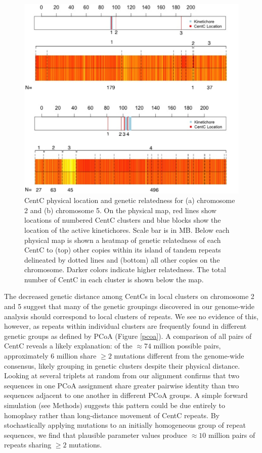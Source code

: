 \begin{figure}[h]
\centering
\includegraphics[width=1\textwidth]{heatmap.png}
\caption{CentC physical location and genetic relatedness for (a) chromosome 2 and (b) chromosome 5.  On the physical map, red lines show locations of numbered CentC clusters and blue blocks show the location of the active kinetichores.  Scale bar is in MB.  Below each physical map is shown a heatmap of genetic relatedness of each CentC to (top) other copies within its island of tandem repeats delineated by dotted lines and (bottom) all other copies on the chromosome.  Darker colors indicate higher relatedness.  The total number of CentC in each cluster is shown below the map.  
}
\label{heatmap}    
\end{figure}

The decreased genetic distance among CentCs in local clusters on chromosome 2 and 5 suggest that many of the genetic groupings discovered in our genome-wide analysis should correspond to local clusters of repeats. We see no evidence of this, however, as repeats within individual clusters are frequently found in different genetic groups as defined by PCoA (Figure \ref{pcoa}).  A comparison of all pairs of CentC reveals a likely explanation: of the $\approx 74$ million possible pairs,  approximately 6 million share $\geq 2$ mutations different from the genome-wide consensus, likely grouping in genetic clusters despite their physical distance.  Looking at several triplets at random from our alignment confirms that two sequences in one PCoA assignment share greater pairwise identity than two sequences adjacent to one another in different PCoA groups.  A simple forward simulation (see Methods) suggests this pattern could be due entirely to homoplasy rather than long-distance movement of CentC repeats.  By stochastically applying mutations to an initially homogeneous group of repeat sequences, we find that plausible parameter values produce $\approx 10$ million pairs of repeats sharing $\geq 2$ mutations.      

